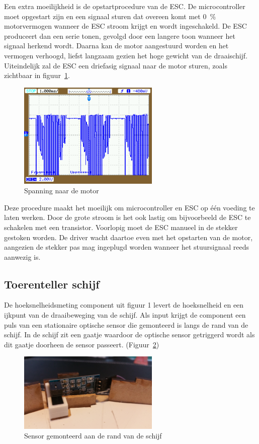 \documentclass[12pt]{ugentreport}
\begin{document}
Een extra moeilijkheid is de opstartprocedure van de ESC.
De microcontroller moet opgestart zijn en een signaal sturen dat overeen komt
met \SI{0}{\percent} motorvermogen wanneer de ESC stroom krijgt en wordt
ingeschakeld. De ESC produceert dan een serie tonen, gevolgd door een langere
toon wanneer het signaal herkend wordt. Daarna kan de motor aangestuurd worden
en het vermogen verhoogd, liefst langzaam gezien het hoge gewicht van de draaischijf.
Uiteindelijk zal de ESC een driefasig signaal naar de motor sturen, zoals
zichtbaar in figuur~\ref{fig:motoresc}.

\begin{figure}
  \centering
  \includegraphics[width=0.6\textwidth]{img/scoopesc.png}
  \caption{Spanning naar de motor}
  \label{fig:motoresc}
\end{figure}

Deze procedure maakt het moeilijk om microcontroller en ESC op één voeding te
laten werken. Door de grote stroom is het ook lastig om bijvoorbeeld de ESC te
schakelen met een transistor. Voorlopig moet de ESC manueel in de stekker
gestoken worden. De driver wacht daartoe even met het opstarten van de motor,
aangezien de stekker pas mag ingeplugd worden wanneer het stuursignaal reeds
aanwezig is.

\subsection{Toerenteller schijf}
De hoeksnelheidsmeting component uit figuur 1 levert de hoeksnelheid en een
ijkpunt van de draaibeweging van de schijf. Als input krijgt de component een
puls van een stationaire optische sensor die gemonteerd is langs de rand van de
schijf. In de schijf zit een gaatje waardoor de optische sensor getriggerd wordt
als dit gaatje doorheen de sensor passeert. (Figuur~\ref{fig:sensor})

\begin{figure}
  \centering
  \includegraphics[width=0.6\textwidth]{img/Sensor.jpg}
  \caption{Sensor gemonteerd aan de rand van de schijf}
  \label{fig:sensor}
\end{figure}
\end{document}
